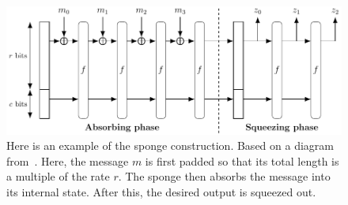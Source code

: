 \begin{figure}[p]
\includegraphics[width=\textwidth]{figures/app_crypto/sponge/sponge.pdf}
\caption[Cryptographic hash function built with Sponge construction]{Here
    is an example of the sponge construction.
    Based on a diagram from~\cite{TikZ:for:Cryptographers}.
    Here, the message $m$ is first padded so that its total length
    is a multiple of the rate $r$.
    The sponge then absorbs the message into its internal state.
    After this, the desired output is squeezed out.}
\label{fig:sponge_construction}
\end{figure}
